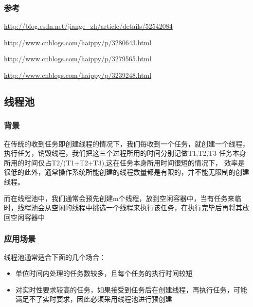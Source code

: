 \documentclass[UTF8,a4paper,12pt]{ctexbook}
\begin{document}
		\subsubsection{参考}
			\url{http://blog.csdn.net/jiange_zh/article/details/52542084}

			\url{http://www.cnblogs.com/haippy/p/3280643.html}
			
			\url{http://www.cnblogs.com/haippy/p/3279565.html}
			
			\url{http://www.cnblogs.com/haippy/p/3239248.html}
	\subsection{线程池}
		\subsubsection{背景}
			在传统的收到任务即创建线程的情况下，我们每收到一个任务，就创建一个线程，执行任务，销毁线程，我们把这三个过程所用的时间分别记做T1,T2,T3
			任务本身所用的时间仅占T2/(T1+T2+T3),这在任务本身所用时间很短的情况下， 效率是很低的此外，通常操作系统所能创建的线程数量都是有限的，并不能无限制的创建线程。
			
			而在线程池中，我们通常会预先创建m个线程，放到空闲容器中，当有任务来临时，线程池会从空闲的线程中挑选一个线程来执行该任务，在执行完毕后再将其放回空闲容器中
		
		\subsubsection{应用场景}线程池通常适合下面的几个场合：
			\begin{itemize}
				\item 单位时间内处理的任务数较多，且每个任务的执行时间较短
				\item 对实时性要求较高的任务，如果接受到任务后在创建线程，再执行任务，可能满足不了实时要求，因此必须采用线程池进行预创建
			\end{itemize}
		
\end{document}
